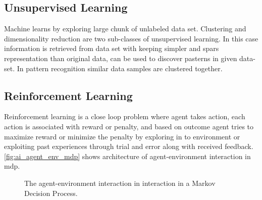 \subsection{Unsupervised Learning}
Machine learns by exploring large chunk of unlabeled data set. Clustering and dimensionality reduction are two sub-classes of unsupervised learning. In this case information is retrieved from data set with keeping simpler and spars representation than original data, can be used to discover pasterns in given data-set. In pattern recognition similar data samples are clustered together.

\subsection{Reinforcement Learning}
Reinforcement learning is a close loop problem where agent takes action, each action is associated with reward or penalty, and based on outcome agent tries to maximize reward or minimize the penalty by exploring in to environment or exploiting past experiences through trial and error along with received feedback. \autoref{fig:ai_agent_env_mdp} shows architecture of agent-environment interaction in \acrlong{mdp}.\cite{russell2010artificial}

\begin{figure}[H]
    \centering


    \caption{The agent-environment interaction in  interaction in a Markov Decision Process. \cite{sutton2018reinforcement}}
    \label{fig:ai_agent_env_mdp}
\end{figure}

